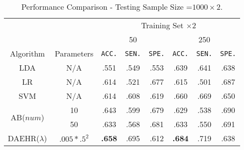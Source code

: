 \documentclass{article}
\begin{document}
\begin{table*}
\footnotesize{
\begin{center}
\caption{Performance Comparison - Testing Sample Size =$1000\times 2$.}
		\label{tab:table13}
\begin{tabular}{*{8}{c}}
\toprule
    & & \multicolumn{6}{c}{Training Set $\times 2$}\\
    \cmidrule(lr){3-8}
    & & 
    \multicolumn{3}{c}{50} &
    \multicolumn{3}{c}{250} \\
\cmidrule(lr){3-5}
\cmidrule(lr){6-8}
Algorithm & Parameters & \texttt{ACC.} & \texttt{SEN.} & \texttt{SPE.} &
                           \texttt{ACC.} & \texttt{SEN.} & \texttt{SPE.} \\
 \cmidrule(lr){1-2}                        
 \cmidrule(lr){3-5}
\cmidrule(lr){6-8}
    LDA & N/A &   .551 & .549 & .553 &     .639 & .641 & .638 \\
 
     \cmidrule(lr){1-2}                        
 \cmidrule(lr){3-5}
\cmidrule(lr){6-8}
    LR & N/A &   .614 & .521 & .677 &     .615 & .501 & .687 \\
    
    \cmidrule(lr){1-2}                        
 \cmidrule(lr){3-5}
\cmidrule(lr){6-8}
    SVM & N/A &   .614 & .608 & .619 &     .660 & .669 & .650 \\
    \cmidrule(lr){1-2}                        
 \cmidrule(lr){3-5}
\cmidrule(lr){6-8}

   \multirow{2}{*}{AB($num$)}  & 10 &   .643 & .599& .679 &     .629 & .538& .690     \\   			
    & 50 &    .633 & .568 & .681 &     .633 & .550 & .691      \\

     \cmidrule(lr){1-2}                        
 \cmidrule(lr){3-5}
\cmidrule(lr){6-8}
     DAEHR($\lambda$) &  $.005*.5^{2}$ &  \textbf{.658} & .695 & .612 &     \textbf{.684} & .719 & .638     \\
       
     \bottomrule
 
\end{tabular}

\end{center}
}
\end{table*}
\end{document}

